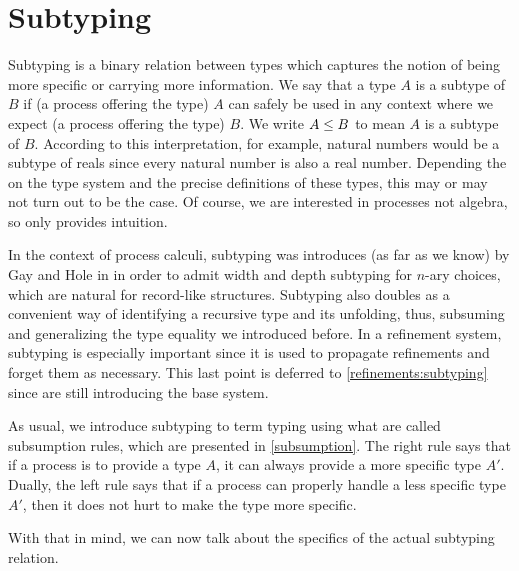 
\chapter{Subtyping}
\label{original-subtyping}

Subtyping is a binary relation between types which captures the notion of being more specific or carrying more information. We say that a type $A$ is a subtype of $B$ if (a process offering the type) $A$ can safely be used in any context where we expect (a process offering the type) $B$. We write $A \le B$ to mean $A$ is a subtype of $B$. According to this interpretation, for example, natural numbers would be a subtype of reals since every natural number is also a real number. Depending the on the type system and the precise definitions of these types, this may or may not turn out to be the case. Of course, we are interested in processes not algebra, so only provides intuition.

In the context of process calculi, subtyping was introduces (as far as we know) by Gay and Hole in \cite{GayH05} in order to admit width and depth subtyping for $n$-ary choices, which are natural for record-like structures. Subtyping also doubles as a convenient way of identifying a recursive type and its unfolding, thus, subsuming and generalizing the type equality we introduced before. In a refinement system, subtyping is especially important since it is used to propagate refinements and forget them as necessary. This last point is deferred to \cref{refinements:subtyping} since are still introducing the base system.

As usual, we introduce subtyping to term typing using what are called subsumption rules, which are presented in \cref{subsumption}. The right rule says that if a process is to provide a type $A$, it can always provide a more specific type $A'$. Dually, the left rule says that if a process can properly handle a less specific type $A'$, then it does not hurt to make the type more specific.


With that in mind, we can now talk about the specifics of the actual subtyping relation.

